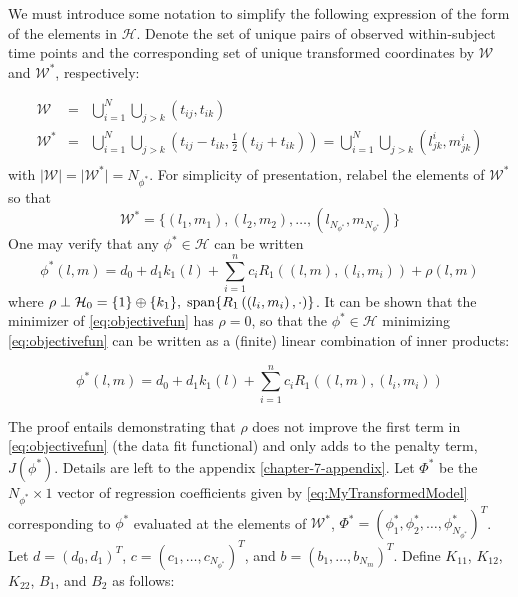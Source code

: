 \documentclass[12pt]{article}
\theoremstyle{definition}
\begin{document}
We must introduce some notation to simplify the following expression of the form of the elements in $\mathcal{H}$. Denote the set of unique pairs of observed within-subject time points and the corresponding set of unique transformed coordinates by $\mathcal{W}$ and $\mathcal{W}^*$, respectively:

\begin{eqnarray*}
\mathcal{W} &=& \bigcup_{i=1}^N \bigcup_{j>k}\left(t_{ij} ,t_{ik} \right)\\
\mathcal{W}^* &=& \bigcup_{i=1}^N \bigcup_{j>k}\left(t_{ij}-t_{ik} ,\frac{1}{2}\left( t_{ij}+t_{ik} \right) \right) = \bigcup_{i=1}^N \bigcup_{j>k}\left(l^i_{jk},m^i_{jk} \right)\\
\end{eqnarray*}
\noindent
with $\vert \mathcal{W}\vert = \vert \mathcal{W}^* \vert = N_{\phi^*}$. For simplicity of presentation, relabel the elements of $\mathcal{W}^*$ so that 
\[
\mathcal{W}^* = \lbrace \left( l_1,m_1 \right), \left( l_2,m_2 \right), \dots, \left( l_{N_{\phi^*}},m_{N_{\phi^*}} \right)  \rbrace
\]
\noindent
One may verify that any $\phi^* \in \mathcal{H}$ can be written 
\begin{equation} \label{eq:smoothing-spline-representer-expansion-1}
\phi^*\left(l,m \right) = d_0 + d_1k_1\left(l\right) + \sum_{i=1}^n  c_i R_1\left( \left(l,m\right) , \left(l_i,m_i \right)\right) + \rho\left(l,m\right)
\end{equation}
\noindent
where $\rho \perp \mathcal{H}_0 = \lbrace 1\rbrace \oplus \lbrace k_1\rbrace,\; \textup{span}\lbrace R_1\left(\left(l_i, m_i \right),\cdot \right)  \rbrace$.  It can be shown that the minimizer of \ref{eq:objectivefun} has $\rho = 0$, so that the $\phi^* \in \mathcal{H}$ minimizing \ref{eq:objectivefun} can be written as a (finite) linear combination of inner products:

\begin{equation}\label{eq:ss-finite-dim-solution}
\phi^*\left(l,m \right) = d_0 + d_1k_1\left(l\right) + \sum_{i=1}^n  c_i R_1\left( \left(l,m\right) , \left(l_i,m_i \right)\right) 
\end{equation}
\noindent

The proof entails demonstrating that  $\rho$ does not improve the first term in \eqref{eq:objectivefun} (the data fit functional) and only adds to the penalty term, $J\left(\phi^*\right)$. Details are left to the appendix \ref{chapter-7-appendix}.
Let $\Phi^*$ be the $N_{\phi^*} \times 1$ vector of regression coefficients given by \eqref{eq:MyTransformedModel} corresponding to $\phi^*$ evaluated at the elements of $\mathcal{W}^*$, $\Phi^* = \left(\phi^*_1,\phi^*_2, \dots, \phi^*_{N_{\phi^*}}  \right)^T$. Let $d = \left(d_0, d_1\right)^T$, $c = \left(c_1, \dots, c_{N_{\phi^*}}  \right)^T$, and $b = \left(b_1, \dots, b_{N_m}  \right)^T$.   Define $K_{11}$, $K_{12}$, $K_{22}$, $B_{1}$, and $B_2$ as follows: 
\end{document}
